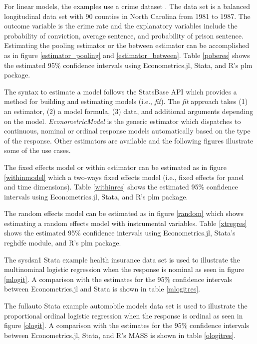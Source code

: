 \documentclass{juliacon}
\begin{document}
For linear models, the examples use a crime dataset \cite{Crime}. The data set is a balanced longitudinal data set with 90 counties in North Carolina from 1981 to 1987. The outcome variable is the crime rate and the explanatory variables include the probability of conviction, average sentence, and probability of prison sentence. Estimating the pooling estimator or the between estimator can be accomplished as in figure \vref{estimator_pooling} and \vref{estimator_between}. Table \vref{poberes} shows the estimated 95\% confidence intervals using Econometrics.jl, Stata, and R's plm package.

The syntax to estimate a model follows the StatsBase API which provides a method for building and estimating models (i.e., \textit{fit}). The \textit{fit} approach takes (1) an estimator, (2) a model formula, (3) data, and additional arguments depending on the model. \textit{EconometricModel} is the generic estimator which dispatches to continuous, nominal or ordinal response models automatically based on the type of the response. Other estimators are available and the following figures illustrate some of the use cases.

The fixed effects model or within estimator can be estimated as in figure \vref{withinmodel} which a two-ways fixed effects model (i.e., fixed effects for panel and time dimensions). Table \vref{withinres} shows the estimated 95\% confidence intervals using Econometrics.jl, Stata, and R's plm package.

The random effects model can be estimated as in figure \vref{random} which shows estimating a random effects model with instrumental variables. Table \vref{xtregres} shows the estimated 95\% confidence intervals using Econometrics.jl, Stata's reghdfe module, and R's plm package.

The sysdsn1 Stata example health insurance data set is used to illustrate the multinominal logistic regression when the response is nominal as seen in figure \vref{mlogit}. A comparison with the estimates for the 95\% confidence intervals between Econometrics.jl and Stata is shown in table \vref{mlogitres}.

The fullauto Stata example automobile models data set is used to illustrate the proportional ordinal logistic regression when the response is ordinal as seen in figure \vref{ologit}. A comparison with the estimates for the 95\% confidence intervals between Econometrics.jl, Stata, and R's MASS is shown in table \vref{ologitres}.
\end{document}
